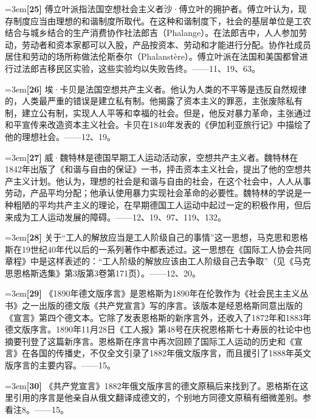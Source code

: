 \documentclass[UTF8,zihao=-4,a4paper]{ctexart}
\begin{document}
\noindent\hangindent=3em\textbf{[25]} 傅立叶派指法国空想社会主义者沙·傅立叶的拥护者。傅立叶认为，现存制度应当由理想的和谐制度所取代。在这种和谐制度下，社会的基层单位是工农结合与城乡结合的生产消费协作社法郎吉（Phalange）。在法郎吉中，人人参加劳动，劳动者和资本家都可以入股，产品按资本、劳动和才能进行分配。协作社成员居住和劳动的场所称做法伦斯泰尔（Phalanstère）。傅立叶派在法国和美国都曾进行过法郎吉移民区实验，这些实验均以失败告终。——11、19、63。\par
\noindent\hangindent=3em\textbf{[26]} 埃·卡贝是法国空想共产主义者。他认为人类的不平等是违反自然规律的，人类最严重的错误是建立私有制。他揭露了资本主义的罪恶，主张废除私有制，建立公有制，实现人人平等和幸福的社会。但是，他反对暴力革命，主张通过和平宣传来改造资本主义社会。卡贝在1840年发表的《伊加利亚旅行记》中描绘了他的理想社会。——12、19。\par
\noindent\hangindent=3em\textbf{[27]} 威·魏特林是德国早期工人运动活动家，空想共产主义者。魏特林在1842年出版了《和谐与自由的保证》一书，抨击资本主义社会，提出了他的空想共产主义计划。他认为，理想的社会是和谐与自由的社会，在这个社会中，人人从事劳动，产品平均分配；他承认使用暴力实现社会革命的必要性。魏特林的学说是一种粗陋的平均共产主义的理论，在早期德国工人运动中起过一定的积极作用，但后来成为工人运动发展的障碍。——12、19、97、119、132。\par
\noindent\hangindent=3em\textbf{[28]} 关于“工人的解放应当是工人阶级自己的事情”这一思想，马克思和恩格斯在19世纪40年代以后的一系列著作中都表述过。这一思想在《国际工人协会共同章程》中是这样表述的：“工人阶级的解放应该由工人阶级自己去争取”（见《马克思恩格斯选集》第3版第3卷第171页）。——12、20。\par
\noindent\hangindent=3em\textbf{[29]} 《1890年德文版序言》是恩格斯为1890年在伦敦作为《社会民主主义丛书》之一出版的德文版《共产党宣言》写的序言。该版本是经恩格斯同意出版的《宣言》第四个德文本。它除了发表恩格斯的新序言外，还收入了1872年和1883年德文版序言。1890年11月28日《工人报》第48号在庆祝恩格斯七十寿辰的社论中也摘要刊登了这篇新序言。恩格斯在序言中再次回顾了国际工人运动的历史和《宣言》在各国的传播史，不仅全文引录了1882年俄文版序言，而且援引了1888年英文版序言的主要内容。——15。\par
\noindent\hangindent=3em\textbf{[30]} 《共产党宣言》1882年俄文版序言的德文原稿后来找到了。恩格斯在这里引用的序言是他亲自从俄文翻译成德文的，个别地方同德文原稿有细微差别。参看注8。——15。\par
\end{document}
